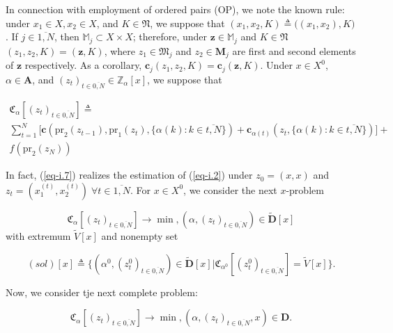 \documentclass{article}
\begin{document}
In connection with employment of ordered pairs
(OP),
we note the known rule:
under
$x_1 \in X, x_2 \in X$,
and
$K \in \mathfrak N$,
we suppose that
$(x_1, x_2, K) \triangleq \big( (x_1, x_2), K\big)$.
If
$j \in \overline{1,N}$,
then
$\mathbb M_j \subset X \times X$;
therefore, under
$\mathbf z \in \mathbb M_j$
and
$K \in \mathfrak N$
$\;$
$(z_1,z_2, K)=(\mathbf z, K)$,
where
$z_1 \in \mathfrak M_j$
and
$z_2 \in \mathbf M_j$
are first and second elements of
$\mathbf z$
respectively.
As a corollary,
$\mathbf c_j(z_1, z_2, K) = \mathbf c_j(\mathbf z, K)$.
Under
$x \in X^0$,
$\alpha \in \mathbf A$,
and
$(z_t)_{t \in \overline{0,N}} \in \mathbb Z_\alpha[x]$,
we suppose that

\begin{multline}
  \label{eq-i.7}
  \mathfrak C_\alpha[(z_t)_{t \in \overline{0,N}}]
  \triangleq \\
  \sum_{t=1}^N
  \big[
    \mathbf c(
      \mathrm{pr}_2(z_{t-1}),
      \mathrm{pr}_1(z_t),
      \{ \alpha(k) : k \in \overline{t, N} \})
    +
    \mathbf c_{\alpha(t)}(z_t, \{ \alpha(k) : k \in \overline{t,N}\})
  \big]
  + \\
  f(\mathrm{pr}_2(z_N))
\end{multline}

In fact,
(\ref{eq-i.7})
realizes the estimation of (\ref{eq-i.2})
under
$z_0 = (x,x)$
and
$z_t =(x_1^{(t)}, x_2^{(t)})
\;
\forall t \in \overline{1, N}$.
For
$x \in X^0$,
we consider the next
$x$-problem

\begin{equation}
  \label{eq-i.8}
  \mathfrak C_\alpha[(z_t)_{t \in \overline{0,N}}]
  \to \min,
  (\alpha, (z_t)_{t \in \overline{0,N}}) \in \tilde{\mathbf D}[x]
\end{equation}
with extremum
$\tilde{V}[x]$
and nonempty set

\begin{equation}
  \label{eq-i.9}
  (sol)[x]
  \triangleq
  \big\{
    (\alpha^0, (z_t^0)_{t \in \overline{0,N}}) \in \tilde{\mathbf D}[x]
  \big|
    \mathfrak C_{\alpha^0}[(z_t^0)_{t \in \overline{0,N}}] = \tilde{V}[x]
  \big\}.
\end{equation}

Now, we consider tje next complete problem:

\begin{equation}
  \label{eq-i.10}
  \mathfrak C_\alpha[(z_t)_{t \in \overline{0,N}}]
  \to \min,
  (\alpha, (z_t)_{t \in \overline{0,N}}, x) \in \mathbf D.
\end{equation}
\end{document}
